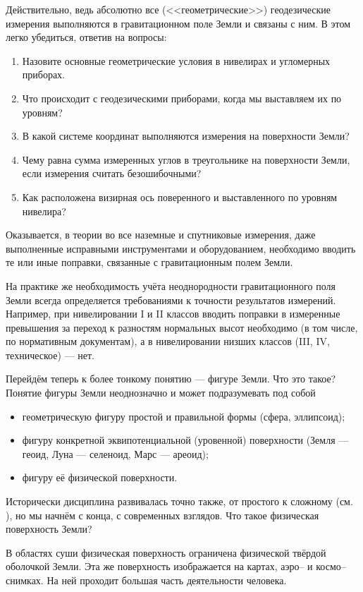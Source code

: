 \documentclass[11pt, a4paper]{article}
\theoremstyle{plain}
\theoremstyle{definition}
\theoremstyle{remark}
\begin{document}
Действительно, ведь абсолютно все (<<геометрические>>) геодезические измерения выполняются в гравитационном поле 
Земли и связаны с ним. В этом легко убедиться, ответив на вопросы:
\begin{enumerate}
    \item Назовите основные геометрические условия в нивелирах и угломерных приборах.
    \item Что происходит с геодезическими приборами, когда мы выставляем их по уровням? 
    \item В какой системе координат выполняются измерения на поверхности Земли?
    \item Чему равна сумма измеренных углов в треугольнике на поверхности Земли, если измерения считать безошибочными?
    \item Как расположена визирная ось поверенного и выставленного по уровням нивелира?
\end{enumerate}
Оказывается, в теории во все наземные и спутниковые измерения, даже выполненные исправными
инструментами и оборудованием, необходимо вводить те или иные поправки, связанные с гравитационным полем Земли.

На практике же необходимость учёта неоднородности гравитационного поля Земли всегда определяется требованиями к
точности результатов измерений. Например, при нивелировании I и II классов вводить поправки в измеренные
превышения за переход к разностям нормальных высот необходимо (в том числе, по нормативным документам), а в 
нивелировании низших классов (III, IV, техническое) --- нет.

Перейдём теперь к более тонкому понятию --- фигуре Земли. Что это такое? 
Понятие фигуры Земли неоднозначно и может подразумевать под собой
\begin{itemize}
    \item геометрическую фигуру простой и правильной формы (сфера, эллипсоид);
    \item фигуру конкретной эквипотенциальной (уровенной) поверхности (Земля --- геоид, Луна --- селеноид, Марс --- ареоид);
    \item фигуру её физической поверхности.
\end{itemize}
Исторически дисциплина развивалась точно также, от простого к сложному (см.
\cite{Ogorodova2013,Yuzefovich2014}), но мы начнём с конца, с современных взглядов. 
Что такое физическая поверхность Земли?

В областях суши физическая поверхность ограничена физической твёрдой оболочкой Земли. Эта же
поверхность изображается на картах, аэро-- и космо-- снимках. На ней проходит большая часть
деятельности человека. 
\end{document}

